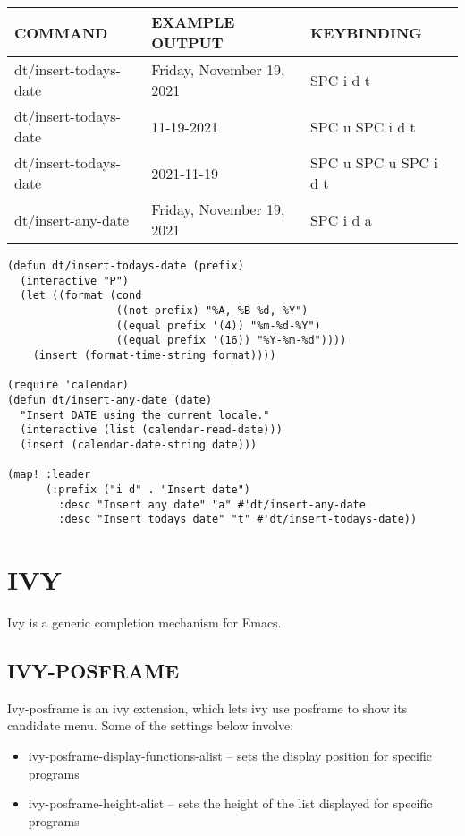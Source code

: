 \documentclass[11pt]{article}
\begin{document}
\begin{center}
\begin{tabular}{lll}
COMMAND & EXAMPLE OUTPUT & KEYBINDING\\[0pt]
\hline
dt/insert-todays-date & Friday, November 19, 2021 & SPC i d t\\[0pt]
dt/insert-todays-date & 11-19-2021 & SPC u SPC i d t\\[0pt]
dt/insert-todays-date & 2021-11-19 & SPC u SPC u SPC i d t\\[0pt]
dt/insert-any-date & Friday, November 19, 2021 & SPC i d a\\[0pt]
\end{tabular}
\end{center}

\begin{verbatim}
(defun dt/insert-todays-date (prefix)
  (interactive "P")
  (let ((format (cond
                 ((not prefix) "%A, %B %d, %Y")
                 ((equal prefix '(4)) "%m-%d-%Y")
                 ((equal prefix '(16)) "%Y-%m-%d"))))
    (insert (format-time-string format))))

(require 'calendar)
(defun dt/insert-any-date (date)
  "Insert DATE using the current locale."
  (interactive (list (calendar-read-date)))
  (insert (calendar-date-string date)))

(map! :leader
      (:prefix ("i d" . "Insert date")
        :desc "Insert any date" "a" #'dt/insert-any-date
        :desc "Insert todays date" "t" #'dt/insert-todays-date))
\end{verbatim}
\section{IVY}
\label{sec:orgd482492}
Ivy is a generic completion mechanism for Emacs.

\subsection{IVY-POSFRAME}
\label{sec:org00af524}
Ivy-posframe is an ivy extension, which lets ivy use posframe to show its candidate menu.  Some of the settings below involve:
\begin{itemize}
\item ivy-posframe-display-functions-alist -- sets the display position for specific programs
\item ivy-posframe-height-alist -- sets the height of the list displayed for specific programs
\end{itemize}
\end{document}
